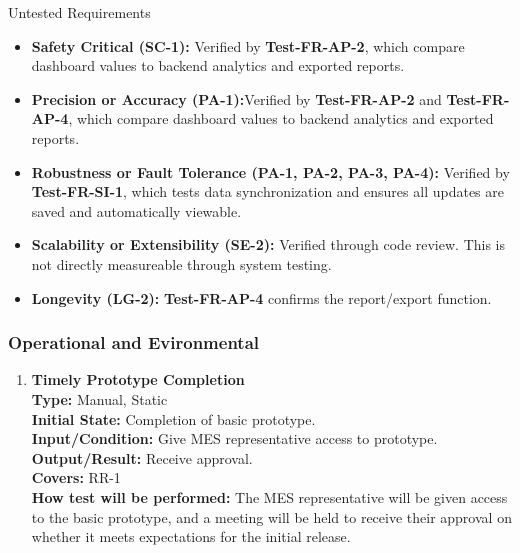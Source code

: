 \documentclass[12pt, titlepage]{article}
\begin{document}
\begin{enumerate}[label=\bfseries PF-\arabic*:, wide=0pt]
{Untested Requirements}
\begin{itemize}
    \item \textbf{Safety Critical (SC-1):} Verified by \textbf{Test-FR-AP-2}, which compare dashboard values to backend analytics and exported reports.

    \item \textbf{Precision or Accuracy (PA-1):}Verified by \textbf{Test-FR-AP-2} and \textbf{Test-FR-AP-4}, which compare dashboard values to backend analytics and exported reports.

    \item \textbf{Robustness or Fault Tolerance (PA-1, PA-2, PA-3, PA-4):} Verified by \textbf{Test-FR-SI-1}, which tests data synchronization and ensures all updates are saved and automatically viewable.

    \item \textbf{Scalability or Extensibility (SE-2):} Verified through code review. This is not directly measureable through system testing.

    \item \textbf{Longevity (LG-2):} \textbf{Test-FR-AP-4} confirms the report/export function.
\end{itemize}

\end{enumerate}

\subsubsection{Operational and Evironmental}
\begin{enumerate}[label=\bfseries OE-\arabic*:, wide=0pt]
  \item \label{test-OE1} \textbf{Timely Prototype Completion}\\[2mm]
    {\bf Type:} Manual, Static\\
    {\bf Initial State:} Completion of basic prototype.\\
    {\bf Input/Condition:} Give MES representative access to prototype.\\
    {\bf Output/Result:} Receive approval.\\
    {\bf Covers:} RR-1\\
    {\bf How test will be performed:} The MES representative will be given access to the basic prototype, and a meeting will be held to receive their approval on whether it meets expectations for the initial release.
\end{enumerate}
\end{document}
